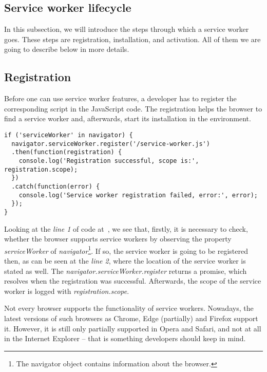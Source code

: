 \subsection{Service worker lifecycle}

In this subsection, we will introduce the steps through which a service worker goes. These steps are registration, installation, and activation. All of them we are going to describe below in more details.

\subsection*{Registration}

Before one can use service worker features, a developer has to register the corresponding script in the JavaScript code. The registration helps the browser to find a service worker and, afterwards, start its installation in the environment.

\begin{lstlisting}[caption={[Code for a Service Worker registration]Code, which demonstrates how to register a service worker\cite{32}.}, label={lst:tech1}]
if ('serviceWorker' in navigator) {
  navigator.serviceWorker.register('/service-worker.js')
  .then(function(registration) {
    console.log('Registration successful, scope is:', registration.scope);
  })
  .catch(function(error) {
    console.log('Service worker registration failed, error:', error);
  });
}
\end{lstlisting}

Looking at the \textit{line 1} of code at~, we see that, firstly, it is necessary to check, whether the browser supports service workers by observing the property \textit{serviceWorker} of \textit{navigator}\footnote{The navigator object contains information about the browser\cite{43}.}. If so, the service worker is going to be registered then, as can be seen at the \textit{line 2}, where the location of the service worker is stated as well. The \textit{navigator.serviceWorker.register} returns a promise, which resolves when the registration was successful. Afterwards, the scope of the service worker is logged with \textit{registration.scope}. 

Not every browser supports the functionality of service workers. Nowadays, the latest versions of such browsers as Chrome, Edge (partially) and Firefox support it. However, it is still only partially supported in Opera and Safari, and not at all in the Internet Explorer\cite{42} -- that is something developers should keep in mind.

